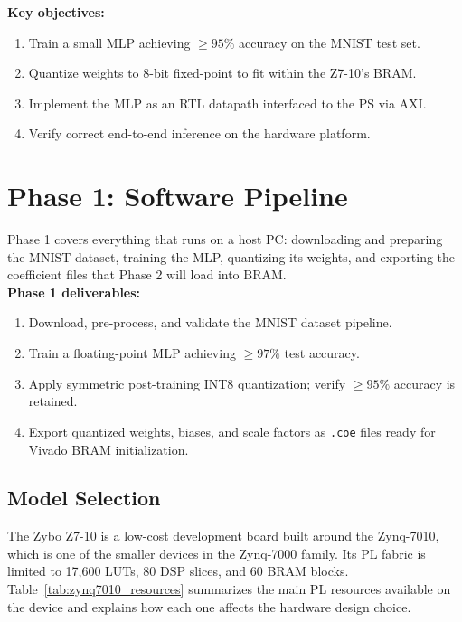 \documentclass[12pt, letterpaper]{article}
\begin{document}
\textbf{Key objectives:}
\begin{enumerate}
    \item Train a small MLP achieving $\geq 95\%$ accuracy on the MNIST test set.
    \item Quantize weights to 8-bit fixed-point to fit within the Z7-10's BRAM.
    \item Implement the MLP as an RTL datapath interfaced to the PS via AXI.
    \item Verify correct end-to-end inference on the hardware platform.
\end{enumerate}

\section{Phase 1: Software Pipeline}

Phase 1 covers everything that runs on a host PC: downloading and preparing
the MNIST dataset, training the MLP, quantizing its weights, and exporting the
coefficient files that Phase 2 will load into BRAM.\\[4pt]

\textbf{Phase 1 deliverables:}
\begin{enumerate}
    \item Download, pre-process, and validate the MNIST dataset pipeline.
    \item Train a floating-point MLP achieving $\geq 97\%$ test accuracy.
    \item Apply symmetric post-training INT8 quantization; verify $\geq 95\%$
          accuracy is retained.
    \item Export quantized weights, biases, and scale factors as \texttt{.coe}
          files ready for Vivado BRAM initialization.
\end{enumerate}

\subsection{Model Selection}

The Zybo Z7-10 is a low-cost development board built around the Zynq-7010, which
is one of the smaller devices in the Zynq-7000 family. Its PL fabric is limited
to 17,600 LUTs, 80 DSP slices, and 60 BRAM blocks. Table~\ref{tab:zynq7010_resources} summarizes
the main PL resources available on the device and explains how each one affects the
hardware design choice.
\end{document}
